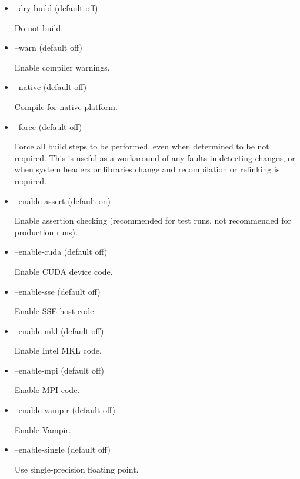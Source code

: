 \begin{itemize}
\item {\sf --dry-build} (default off)

Do not build.

\item {\sf --warn} (default off)

Enable compiler warnings.

\item {\sf --native} (default off)

Compile for native platform.

\item {\sf --force} (default off)

Force all build steps to be performed, even when determined to be not
required. This is useful as a workaround of any faults in detecting
changes, or when system headers or libraries change and recompilation or
relinking is required.

\item {\sf --enable-assert} (default on)

Enable assertion checking (recommended for test runs, not recommended for
production runs).

\item {\sf --enable-cuda} (default off)

Enable CUDA device code.

\item {\sf --enable-sse} (default off)

Enable SSE host code.

\item {\sf --enable-mkl} (default off)

Enable Intel MKL code.

\item {\sf --enable-mpi} (default off)

Enable MPI code.

\item {\sf --enable-vampir} (default off)

Enable Vampir.

\item {\sf --enable-single} (default off)

Use single-precision floating point.
\end{itemize}


